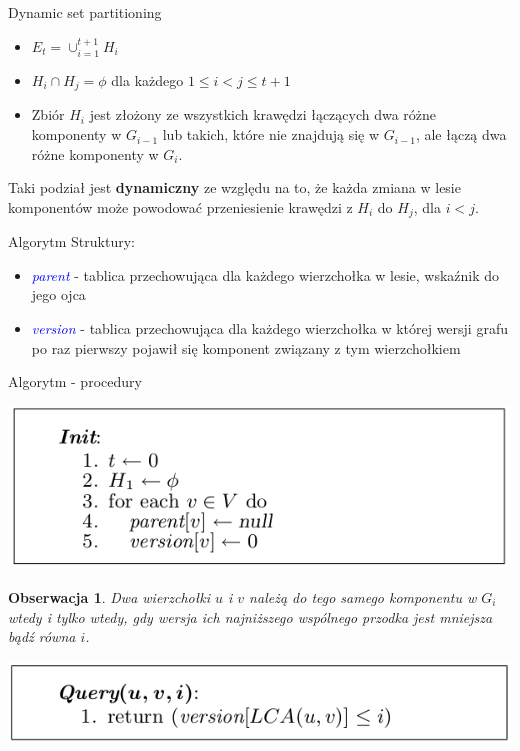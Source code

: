 \documentclass{beamer}
\newtheorem{obs}{Obserwacja}
\newcommand{\emp}[1]{\textcolor{blue}{\textit{#1}}}
\begin{document}
\begin{frame}{Dynamic set partitioning}
\begin{itemize}
\item $E_t = \cup^{t+1}_{i=1}H_i$
\item $H_i \cap H_j = \phi$ dla każdego $1 \leq i < j \leq t+1$
\item Zbiór $H_i$ jest złożony ze wszystkich krawędzi łączących dwa różne komponenty w $G_{i-1}$ lub takich, które nie znajdują się w $G_{i-1}$, ale łączą dwa różne komponenty w $G_i$.
\end{itemize}

\begin{block}{}
Taki podział jest \textbf{dynamiczny} ze względu na to, że każda zmiana w lesie komponentów może powodować przeniesienie krawędzi z $H_i$ do $H_j$, dla $i < j$.
\end{block}
\end{frame}

\begin{frame}{Algorytm}
Struktury:
\begin{itemize}
\item \emp{parent} - tablica przechowująca dla każdego wierzchołka w lesie, wskaźnik do jego ojca
\item \emp{version} - tablica przechowująca dla każdego wierzchołka w której wersji grafu po raz pierwszy pojawił się komponent związany z tym wierzchołkiem
\end{itemize}
\end{frame}

\begin{frame}{Algorytm - procedury}
\begin{center}
\includegraphics[scale=0.4]{img/Init.png}
\end{center}

\begin{obs}
Dwa wierzchołki $u$ i $v$ należą do tego samego komponentu w $G_i$ wtedy i tylko wtedy, gdy wersja ich najniższego wspólnego przodka jest mniejsza bądź równa $i$.
\end{obs}

\begin{center}
\includegraphics[scale=0.4]{img/Query.png}
\end{center}
\end{frame}
\end{document}
